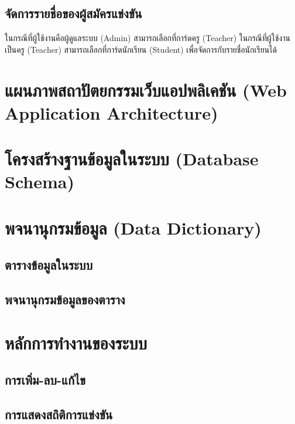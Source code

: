 \subsection{จัดการรายชื่อของผู้สมัครแข่งขัน}

ในกรณีที่ผู้ใช้งานคือผู้ดูแลระบบ (Admin) สามารถเลือกที่การ์ดครู (Teacher)
ในกรณีที่ผู้ใช้งานเป็นครู (Teacher) สามารถเลือกที่การ์ดนักเรียน (Student) เพื่อจัดการกับรายชื่อนักเรียนได้

\section{แผนภาพสถาปัตยกรรมเว็บแอปพลิเคชัน (Web Application Architecture)}

\section{โครงสร้างฐานข้อมูลในระบบ (Database Schema)}

\section{พจนานุกรมข้อมูล (Data Dictionary)}

\subsection{ตารางข้อมูลในระบบ}


\subsection{พจนานุกรมข้อมูลของตาราง}








\section{หลักการทำงานของระบบ}

\subsection{การเพิ่ม-ลบ-แก้ไข}

\subsection{การแสดงสถิติการแข่งขัน}